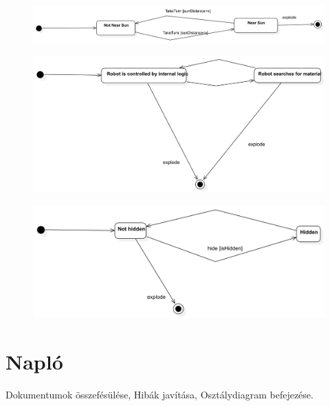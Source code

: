 \documentclass[../../projlab]{subfiles}
\begin{document}
\begin{figure}[H]
	\includegraphics[width=1\textwidth]{docs/2_Project/svg/Design Model!NearSun!NearSun_3.png}
	\centering
\end{figure}


\begin{figure}[H]
	\includegraphics[width=1\textwidth]{docs/2_Project/svg/Design Model!RobotActivities!RobotActivities_4.png}
	\centering
\end{figure}

\begin{figure}[H]
	\includegraphics[width=1\textwidth]{docs/2_Project/svg/Design Model!Spaceship Hide!Spaceship Hide_5.png}
	\centering
\end{figure}

\section{Napló}

\begin{naplo}
	{ 
		Dokumentumok összefésülése, Hibák javítása, Osztálydiagram befejezése.   
	}

\end{naplo}

\begin{toappendix}



	
\end{toappendix}
\end{document}
